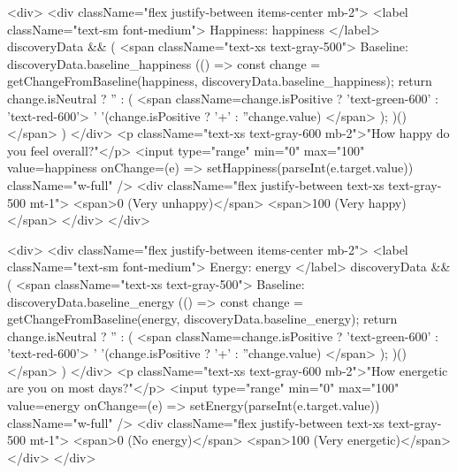 {            <div>
              <div className="flex justify-between items-center mb-2">
                <label className="text-sm font-medium">
                  Happiness: {happiness}
                </label>
                {discoveryData && (
                  <span className="text-xs text-gray-500">
                    Baseline: {discoveryData.baseline_happiness}
                    {(() => {
                      const change = getChangeFromBaseline(happiness, discoveryData.baseline_happiness);
                      return change.isNeutral ? '' : (
                        <span className={change.isPositive ? 'text-green-600' : 'text-red-600'}>
                          {' '}({change.isPositive ? '+' : ''}{change.value})
                        </span>
                      );
                    })()}
                  </span>
                )}
              </div>
              <p className="text-xs text-gray-600 mb-2">"How happy do you feel overall?"</p>
              <input
                type="range"
                min="0"
                max="100"
                value={happiness}
                onChange={(e) => setHappiness(parseInt(e.target.value))}
                className="w-full"
              />
              <div className="flex justify-between text-xs text-gray-500 mt-1">
                <span>0 (Very unhappy)</span>
                <span>100 (Very happy)</span>
              </div>
            </div>

            <div>
              <div className="flex justify-between items-center mb-2">
                <label className="text-sm font-medium">
                  Energy: {energy}
                </label>
                {discoveryData && (
                  <span className="text-xs text-gray-500">
                    Baseline: {discoveryData.baseline_energy}
                    {(() => {
                      const change = getChangeFromBaseline(energy, discoveryData.baseline_energy);
                      return change.isNeutral ? '' : (
                        <span className={change.isPositive ? 'text-green-600' : 'text-red-600'}>
                          {' '}({change.isPositive ? '+' : ''}{change.value})
                        </span>
                      );
                    })()}
                  </span>
                )}
              </div>
              <p className="text-xs text-gray-600 mb-2">"How energetic are you on most days?"</p>
              <input
                type="range"
                min="0"
                max="100"
                value={energy}
                onChange={(e) => setEnergy(parseInt(e.target.value))}
                className="w-full"
              />
              <div className="flex justify-between text-xs text-gray-500 mt-1">
                <span>0 (No energy)</span>
                <span>100 (Very energetic)</span>
              </div>
            </div>

}
